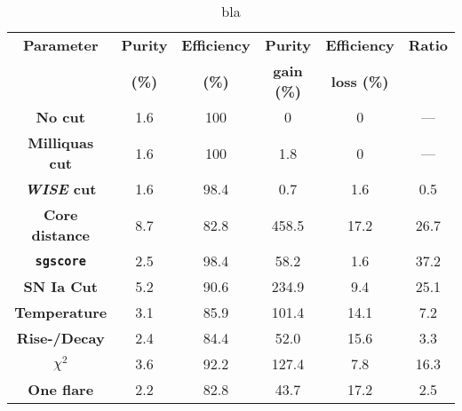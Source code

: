 \begin{table}
    \centering
    \def\arraystretch{1.2}
    \begin{tabular}{c c c c c c}
        \textbf{Parameter}         & \textbf{Purity} & \textbf{Efficiency} & \textbf{Purity}    & \textbf{Efficiency} & \textbf{Ratio} \\
                                   & \textbf{(\%)}   & \textbf{(\%)}       & \textbf{gain (\%)} & \textbf{loss (\%)}  &                \\
        \hline
        \textbf{No cut}            & 1.6             & 100                 & 0                  & 0                   & ---            \\
        \textbf{Milliquas cut}     & 1.6             & 100                 & 1.8                & 0                   & ---            \\
        \textbf{\textit{WISE} cut} & 1.6             & 98.4                & 0.7                & 1.6                 & 0.5            \\
        \textbf{Core distance}     & 8.7             & 82.8                & 458.5              & 17.2                & 26.7           \\
        \textbf{\texttt{sgscore}}  & 2.5             & 98.4                & 58.2               & 1.6                 & 37.2           \\
        \textbf{SN Ia Cut}         & 5.2             & 90.6                & 234.9              & 9.4                 & 25.1           \\
        \textbf{Temperature}       & 3.1             & 85.9                & 101.4              & 14.1                & 7.2            \\
        \textbf{Rise-/Decay}       & 2.4             & 84.4                & 52.0               & 15.6                & 3.3            \\
        \textbf{$\chi^2$}          & 3.6             & 92.2                & 127.4              & 7.8                 & 16.3           \\
        \textbf{One flare}         & 2.2             & 82.8                & 43.7               & 17.2                & 2.5            \\
    \end{tabular}
    \caption[bla]{bla}
    \label{tab:visual_selection}
\end{table}